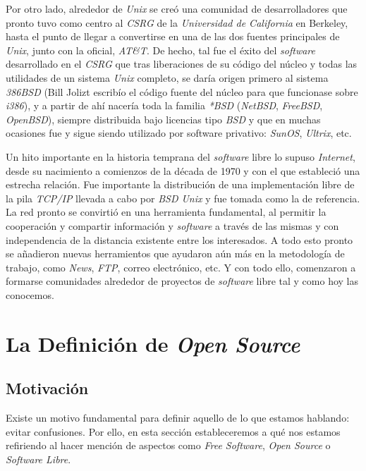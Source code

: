 Por otro lado, alrededor de \textit{Unix} se creó una comunidad de
desarrolladores que pronto tuvo como centro al \textit{CSRG} de la
\textit{Universidad de California} en Berkeley, hasta el punto de llegar a
convertirse en una de las dos fuentes principales de \textit{Unix}, junto con la
oficial, \textit{AT&T}. De hecho, tal fue el éxito del \textit{software}
desarrollado en el \textit{CSRG} que tras liberaciones de su código del núcleo y
todas las utilidades de un sistema \textit{Unix} completo, se daría origen
primero al sistema \textit{386BSD} (Bill Jolizt escribío el código fuente del
núcleo para que funcionase sobre \textit{i386}), y a partir de ahí nacería toda
la familia \textit{*BSD} (\textit{NetBSD}, \textit{FreeBSD}, \textit{OpenBSD}),
siempre distribuida bajo licencias tipo \textit{BSD} y que en muchas ocasiones
fue y sigue siendo utilizado por software privativo: \textit{SunOS},
\textit{Ultrix}, etc.

Un hito importante en la historia temprana del \textit{software} libre lo supuso
\textit{Internet}, desde su nacimiento a comienzos de la década de 1970 y con el
que estableció una estrecha relación. Fue importante la distribución de una
implementación libre de la pila \textit{TCP/IP} llevada a cabo por \textit{BSD
Unix} y fue tomada como la de referencia. La red pronto se convirtió en una
herramienta fundamental, al permitir la cooperación y compartir información y
\textit{software} a través de las mismas y con independencia de la distancia
existente entre los interesados. A todo esto pronto se añadieron nuevas
herramientos que ayudaron aún más en la metodología de trabajo, como
\textit{News}, \textit{FTP}, correo electrónico, etc. Y con todo ello,
comenzaron a formarse comunidades alrededor de proyectos de \textit{software}
libre tal y como hoy las conocemos.


\section{La Definición de \textit{Open Source}}

\subsection{Motivación}
\label{SUBSEC:DefinicionMotivacion}

Existe un motivo fundamental para definir aquello de lo que estamos hablando:
evitar confusiones. Por ello, en esta sección estableceremos a qué nos estamos
refiriendo al hacer mención de aspectos como \textit{Free Software},
\textit{Open Source} o \textit{Software Libre}.

